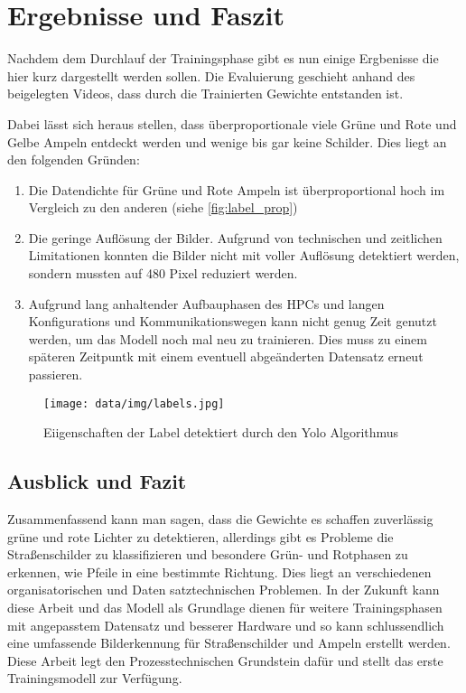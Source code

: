 \chapter{Ergebnisse und Faszit}
Nachdem dem Durchlauf der Trainingsphase gibt es nun einige Ergbenisse die hier kurz dargestellt werden sollen. Die Evaluierung geschieht anhand des beigelegten Videos, dass durch die Trainierten Gewichte entstanden ist.

Dabei lässt sich heraus stellen, dass überproportionale viele Grüne und Rote und Gelbe Ampeln entdeckt werden und wenige bis gar keine Schilder. Dies liegt an den folgenden Gründen:

\begin{enumerate}
    \item Die Datendichte für Grüne und Rote Ampeln ist überproportional hoch im Vergleich zu den anderen (siehe \autoref{fig:label_prop})
    \item Die geringe Auflösung der Bilder. Aufgrund von technischen und zeitlichen Limitationen konnten die Bilder nicht mit voller Auflösung detektiert werden, sondern mussten auf 480 Pixel reduziert werden.
    \item Aufgrund lang anhaltender Aufbauphasen des HPCs und langen Konfigurations und Kommunikationswegen kann nicht genug Zeit genutzt werden, um das Modell noch mal neu zu trainieren. Dies muss zu einem späteren Zeitpuntk mit einem eventuell abgeänderten Datensatz erneut passieren.
\end{enumerate}

\begin{figure}
    \texttt{[image: data/img/labels.jpg]}
    \caption{Eiigenschaften der Label detektiert durch den Yolo Algorithmus}
    \label{fig:label_prop}
\end{figure}

\section{Ausblick und Fazit}

Zusammenfassend kann man sagen, dass die Gewichte es schaffen zuverlässig grüne und rote Lichter zu detektieren, allerdings gibt es Probleme die Straßenschilder zu klassifizieren und besondere Grün- und Rotphasen zu erkennen, wie Pfeile in eine bestimmte Richtung. Dies liegt an verschiedenen organisatorischen und Daten satztechnischen Problemen. In der Zukunft kann diese Arbeit und das Modell als Grundlage dienen für weitere Trainingsphasen mit angepasstem Datensatz und besserer Hardware und so kann schlussendlich eine umfassende Bilderkennung für Straßenschilder und Ampeln erstellt werden. Diese Arbeit legt den Prozesstechnischen Grundstein dafür und stellt das erste Trainingsmodell zur Verfügung.